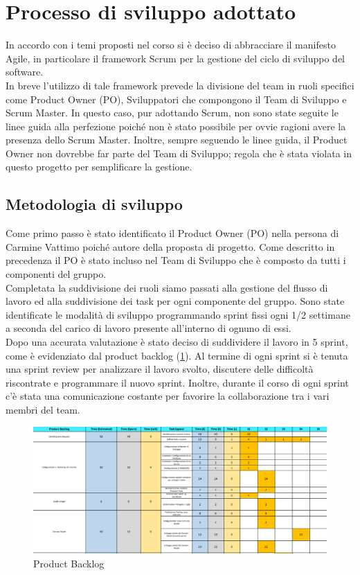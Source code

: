\documentclass[12pt, italian]{article}
\begin{document}
\section{Processo di sviluppo adottato}
In accordo con i temi proposti nel corso si è deciso di abbracciare il manifesto Agile, in particolare il framework Scrum per la gestione del ciclo di sviluppo del software.\\
In breve l'utilizzo di tale framework prevede la divisione del team in ruoli specifici come Product Owner (PO), Sviluppatori che compongono il Team di Sviluppo e Scrum Master. In questo caso, pur adottando Scrum, non sono state seguite le linee guida alla perfezione poiché non è stato possibile per ovvie ragioni avere la presenza dello Scrum Master. Inoltre, sempre seguendo le linee guida, il Product Owner non dovrebbe far parte del Team di Sviluppo; regola che è stata violata in questo progetto per semplificare la gestione.

\subsection{Metodologia di sviluppo}
Come primo passo è stato identificato il Product Owner (PO) nella persona di Carmine Vattimo poiché autore della proposta di progetto. Come descritto in precedenza il PO è stato incluso nel Team di Sviluppo che è composto da tutti i componenti del gruppo.\\
Completata la suddivisione dei ruoli siamo passati alla gestione del flusso di lavoro ed alla suddivisione dei task per ogni componente del gruppo. Sono state identificate le modalità di sviluppo programmando sprint fissi ogni 1/2 settimane a seconda del carico di lavoro presente all'interno di ognuno di essi.\\
Dopo una accurata valutazione è stato deciso di suddividere il lavoro in 5 sprint, come è evidenziato dal product backlog (\ref{product_backlog}).
Al termine di ogni sprint si è tenuta una sprint review per analizzare il lavoro svolto, discutere delle difficoltà riscontrate e programmare il nuovo sprint. Inoltre, durante il corso di ogni sprint c'è stata una comunicazione costante per favorire la collaborazione tra i vari membri del team.
\begin{figure}[H]
    \centering
    \includegraphics[width=1\textwidth]{img/backlog01.png}
    \caption{Product Backlog}
    \label{product_backlog}
\end{figure}
\end{document}

